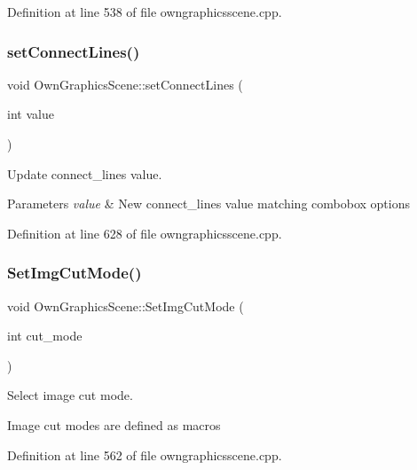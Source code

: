 Definition at line 538 of file owngraphicsscene.\+cpp.

\mbox{\label{classOwnGraphicsScene_ad62254e1884fa4817ff1beaa3bc6c011}} 
\subsubsection{\texorpdfstring{set\+Connect\+Lines()}{setConnectLines()}}
{\footnotesize\ttfamily void Own\+Graphics\+Scene\+::set\+Connect\+Lines (\begin{DoxyParamCaption}\item[{int}]{value }\end{DoxyParamCaption})}



Update connect\+\_\+lines value. 


\begin{DoxyParams}{Parameters}
{\em value} & New connect\+\_\+lines value matching combobox options \\
\hline
\end{DoxyParams}


Definition at line 628 of file owngraphicsscene.\+cpp.

\mbox{\label{classOwnGraphicsScene_a656919c9fdd0827ae182d3d3f5f91e4f}} 
\subsubsection{\texorpdfstring{Set\+Img\+Cut\+Mode()}{SetImgCutMode()}}
{\footnotesize\ttfamily void Own\+Graphics\+Scene\+::\+Set\+Img\+Cut\+Mode (\begin{DoxyParamCaption}\item[{int}]{cut\+\_\+mode }\end{DoxyParamCaption})}



Select image cut mode. 

Image cut modes are defined as macros 

Definition at line 562 of file owngraphicsscene.\+cpp.

